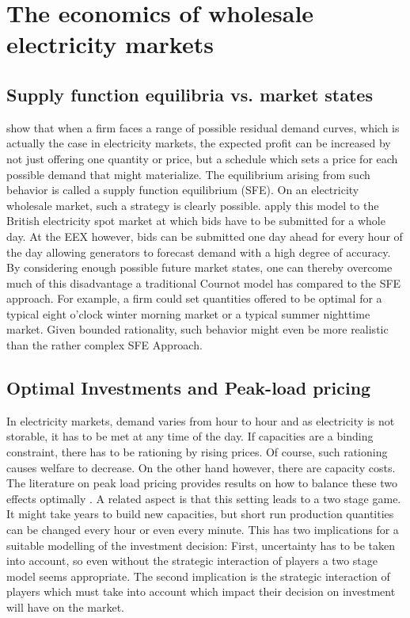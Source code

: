 \section{The economics of wholesale electricity markets} \label{sect:3}



\subsection{Supply function equilibria vs. market states}

\cite{Klemperer1989} show that when a firm faces a range of possible residual demand curves, which is actually the case in electricity markets, the expected profit can be increased by not just offering one quantity or price, but a schedule which sets a price for each possible demand that might materialize. The equilibrium arising from such behavior is called a supply function equilibrium (SFE). On an electricity wholesale market, such a strategy is clearly possible. \cite{Green1992} apply this model to the British electricity spot market at which bids have to be submitted for a whole day. At the EEX however, bids can be submitted one day ahead for every hour of the day allowing generators to forecast demand with a high degree of accuracy. By considering enough possible future market states, one can thereby overcome much of this disadvantage a traditional Cournot model has compared to the SFE approach. For example, a firm could set quantities offered to be optimal for a typical eight o'clock winter morning market or a typical summer nighttime market. Given bounded rationality, such behavior might even be more realistic than the rather complex SFE Approach.

\subsection{Optimal Investments and Peak-load pricing}

In electricity markets, demand varies from hour to hour and as electricity is not storable, it has to be met at any time of the day. If capacities are a binding constraint, there has to be rationing by rising prices. Of course, such rationing causes welfare to decrease. On the other hand however, there are capacity costs. The literature on peak load pricing provides results on how to balance these two effects optimally \citep[see][]{Crew1986}. A related aspect is that this setting leads to a two stage game. It might take years to build new capacities, but short run production quantities can be changed every hour or even every minute. This has two implications for a suitable modelling of the investment decision: First, uncertainty has to be taken into account, so even without the strategic interaction of players a two stage model seems appropriate. The second implication is the strategic interaction of players which must take into account which impact their decision on investment will have on the market.

